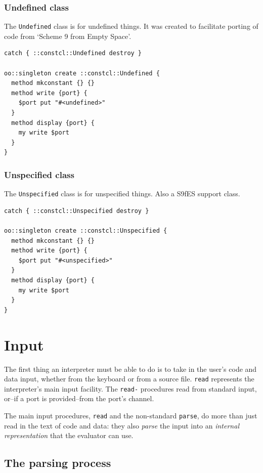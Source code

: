 \documentclass[twoside,9pt]{report}
\begin{document}
\subsection{Undefined class}
\label{undefined-class}


The \texttt{Undefined} class is for undefined things. It was created to facilitate porting of code from `Scheme 9 from Empty Space'.

\begin{lstlisting}
catch { ::constcl::Undefined destroy }

oo::singleton create ::constcl::Undefined {
  method mkconstant {} {}
  method write {port} {
    $port put "#<undefined>"
  }
  method display {port} {
    my write $port
  }
}
\end{lstlisting}
\subsection{Unspecified class}
\label{unspecified-class}


The \texttt{Unspecified} class is for unspecified things. Also a S9fES support class.

\begin{lstlisting}
catch { ::constcl::Unspecified destroy }

oo::singleton create ::constcl::Unspecified {
  method mkconstant {} {}
  method write {port} {
    $port put "#<unspecified>"
  }
  method display {port} {
    my write $port
  }
}
\end{lstlisting}
\chapter{Input}
\label{input}


The first thing an interpreter must be able to do is to take in the user's code and data input, whether from the keyboard or from a source file. \texttt{read} represents the interpreter's main input facility. The \texttt{read-} procedures read from standard input, or--if a port is provided--from the port's channel.


The main input procedures, \texttt{read} and the non-standard \texttt{parse}, do more than just read in the text of code and data: they also \emph{parse} the input into an \emph{internal representation} that the evaluator can use.

\section{The parsing process}
\label{the-parsing-process}
\end{document}
